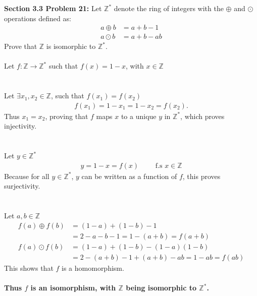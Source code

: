 \documentclass[12pt]{article}
\begin{document}
\noindent \textbf{Section 3.3 Problem 21: }Let $\mathbb{Z}^*$ denote the ring of integers with the $\oplus$ and $\odot$ operations defined as: 
	\begin{align*}
		a \oplus b &= a + b - 1 \\
		a \odot b &= a + b - ab
	\end{align*}
Prove that $\mathbb{Z}$ is isomorphic to $\mathbb{Z}^*$.
\\ \\
	Let $f: \mathbb{Z} \rightarrow \mathbb{Z}^*$ such that $f(x) = 1 - x$, with $x \in \mathbb{Z}$ 
	\\ \\ \\
	Let $\exists x_1, x_2 \in \mathbb{Z}$, such that $f(x_1) = f(x_2)$
	\begin{align*}
		f(x_1) = 1 - x_1 = 1 - x_2 = f(x_2).
	\end{align*}
	Thus $x_1 = x_2$, proving that $f$ maps $x$ to a unique $y$ in $\mathbb{Z}^*$, which proves injectivity.
	\\ \\ \\
	Let $y \in \mathbb{Z}^*$
	\begin{align*}
		y = 1 - x = f(x) \qquad \text{ f.s } x \in \mathbb{Z}
	\end{align*}
	 Because for all $y \in \mathbb{Z}^*$, $y$ can be written as a function of $f$, this proves surjectivity.
	 \\ \\ \\
	 Let $a,b \in \mathbb{Z}$
	 \begin{align*}
	 	f(a) \oplus f(b) &= (1 - a) + (1 - b) - 1 \\
	 	&= 2 - a - b - 1 = 1 - (a+b) = f(a+b) \\
	 	f(a) \odot f(b) &= (1 - a) + (1 - b) - (1 - a)(1 - b) \\
	 	&= 2 - (a + b) - 1 + (a + b) - ab = 1 - ab = f(ab)
	 \end{align*}
		This shows that $f$ is a homomorphism. 
	\\ \\
	\textbf{\boldmath Thus $f$ is an isomorphism, with $\mathbb{Z}$ being isomorphic to $\mathbb{Z}^*$.}
	
\newpage 
\end{document}
